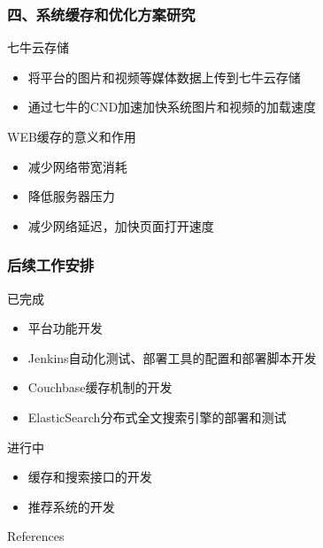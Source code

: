 \documentclass{beamer}
\begin{document}
\begin{frame}
\frametitle{四、系统缓存和优化方案研究}
  \begin{block}{七牛云存储}
    \begin{itemize}
      \item 将平台的图片和视频等媒体数据上传到七牛云存储
      \item 通过七牛的CND加速加快系统图片和视频的加载速度
    \end{itemize} 
  \end{block}
  \begin{block}{WEB缓存的意义和作用}
    \begin{itemize}
      \item 减少网络带宽消耗
      \item 降低服务器压力
      \item 减少网络延迟，加快页面打开速度
    \end{itemize} 
  \end{block}
\end{frame}
\begin{frame}
\frametitle{后续工作安排}
  \begin{block}{已完成 }
	\begin{itemize}
		\item 平台功能开发
		\item Jenkins自动化测试、部署工具的配置和部署脚本开发
        		\item Couchbase缓存机制的开发
		\item ElasticSearch分布式全文搜索引擎的部署和测试
	\end{itemize}
  \end{block}
  \begin{block}{进行中}
	\begin{itemize}
    \item 缓存和搜索接口的开发
    \item 推荐系统的开发
	\end{itemize}
  \end{block}
\end{frame}


\begin{frame}[allowframebreaks]{References}
  \scriptsize
  
  
\end{frame}
\end{document}
